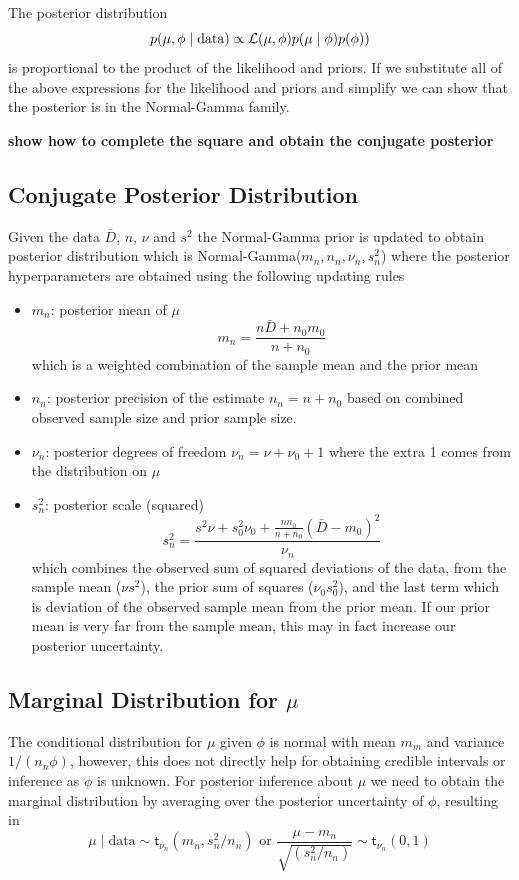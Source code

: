 \documentclass[11pt]{article}
\newcommand{\St}{\textsf{t}}
\def\data{\text{data}}
\begin{document}
The posterior distribution 
$$
p(\mu, \phi \mid \data) \propto {\cal{L}}(\mu, \phi) p(\mu \mid \phi) p(\phi)
)
$$
is proportional to the product of the likelihood and priors.
If we substitute all of the above expressions for the likelihood and priors and simplify we can show that the posterior is in the Normal-Gamma family.

{\bf show how to complete the square and obtain the conjugate posterior}

\subsection*{Conjugate Posterior Distribution}
Given the data $\bar{D}$, $n$, $\nu$ and $s^2$ the Normal-Gamma prior is updated to obtain posterior distribution which is Normal-Gamma($m_n, n_n, \nu_n, s^2_n$) where the posterior hyperparameters are obtained using the following updating rules
\begin{itemize}
\item $m_n$: posterior mean of $\mu$  
$$m_n = \frac{n \bar{D} + n_0 m_0}{n + n_0}$$
which is a weighted combination of the sample mean and the prior mean
\item $n_n$:  posterior precision of the estimate $n_n = n + n_0$  based on combined observed sample size and prior sample size.
\item $\nu_n$: posterior degrees of freedom $\nu_n = \nu + \nu_0 + 1$ where the extra 1 comes from the distribution on $\mu$
\item $s^2_n$: posterior scale (squared)  
$$ s^2_n = \frac{ s^2 \nu + s^2_0 \nu_0 +  \frac{n n_0} {n + n_0} (\bar{D} - m_0)^2}{\nu_n} $$
which combines the observed sum of squared deviations of the data,  from the sample mean ($\nu s^2$), the prior sum of squares ($\nu_0 s^2_0$), and the last term which is deviation of the observed sample mean from the prior mean. If our   prior mean is very far from the sample mean, this may in fact increase our posterior uncertainty.
\end{itemize}



\subsection*{Marginal Distribution for $\mu$}
The conditional distribution for $\mu$ given $\phi$ is normal with mean $m_m$ and
variance $1/(n_n \phi)$, however, this does not directly help for obtaining credible intervals or inference as $\phi$ is unknown.
For posterior inference about $\mu$ we need to obtain the marginal distribution by
averaging  over the posterior uncertainty of $\phi$, resulting in 
$$
\mu \mid \data  \sim \St_{\nu_n}(m_n, s^2_n/n_n)  \text{ or }  \frac{\mu - m_n}{\sqrt{(s^2_n/n_n)}} \sim \St_{\nu_n}(0,1)
$$
\end{document}
